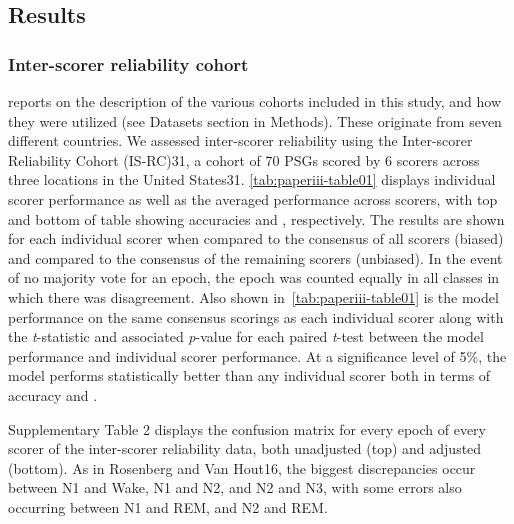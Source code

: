 \subsection{Results}
\subsubsection{Inter-scorer reliability cohort}

 reports on the description of the various cohorts included in this study, and how they were utilized (see Datasets section in Methods).
These originate from seven different countries. 
We assessed inter-scorer reliability using the Inter-scorer Reliability Cohort (IS-RC)31, a cohort of 70 PSGs scored by 6 scorers across three locations in the United States31.
\cref{tab:paperiii-table01} displays individual scorer performance as well as the averaged performance across scorers, with top and bottom of table showing accuracies and \cohen, respectively.
The results are shown for each individual scorer when compared to the consensus of all scorers (biased) and compared to the consensus of the remaining scorers (unbiased).
In the event of no majority vote for an epoch, the epoch was counted equally in all classes in which there was disagreement.
Also shown in~\cref{tab:paperiii-table01} is the model performance on the same consensus scorings as each individual scorer along with the \textit{t}-statistic and associated \textit{p}-value for each paired \textit{t}-test between the model performance and individual scorer performance. 
At a significance level of 5\%, the model performs statistically better than any individual scorer both in terms of accuracy and \cohen.

Supplementary Table 2 displays the confusion matrix for every epoch of every scorer of the inter-scorer reliability data, both unadjusted (top) and adjusted (bottom).
As in Rosenberg and Van Hout16, the biggest discrepancies occur between N1 and Wake, N1 and N2, and N2 and N3, with some errors also occurring between N1 and REM, and N2 and REM.

